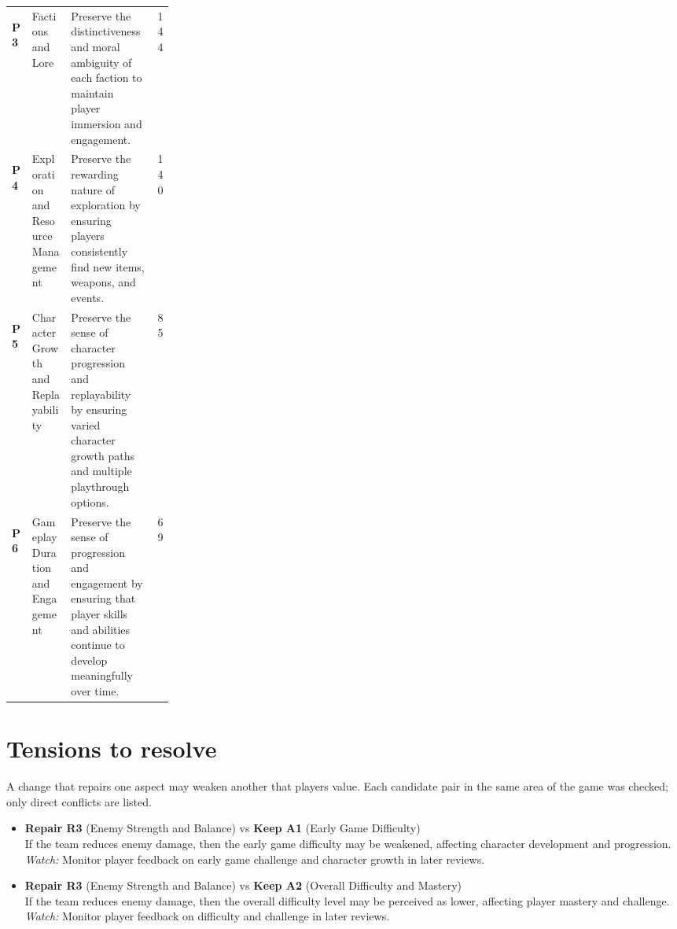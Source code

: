 \documentclass[10pt]{article}
\begin{document}
{\begin{tabularx}{\linewidth}{l p{0.24\linewidth} X r}
  \colorbox{lP}{\strut\textcolor{gP}{\textbf{P3}}} & Factions and Lore & Preserve the distinctiveness and moral ambiguity of each faction to maintain player immersion and engagement. & 144 \\
  \colorbox{lP}{\strut\textcolor{gP}{\textbf{P4}}} & Exploration and Resource Management & Preserve the rewarding nature of exploration by ensuring players consistently find new items, weapons, and events. & 140 \\
  \colorbox{lP}{\strut\textcolor{gP}{\textbf{P5}}} & Character Growth and Replayability & Preserve the sense of character progression and replayability by ensuring varied character growth paths and multiple playthrough options. & 85 \\
  \colorbox{lP}{\strut\textcolor{gP}{\textbf{P6}}} & Gameplay Duration and Engagement & Preserve the sense of progression and engagement by ensuring that player skills and abilities continue to develop meaningfully over time. & 69 \\
  \bottomrule
\end{tabularx}}

\section*{Tensions to resolve}
{\small\textcolor{ink2}{A change that repairs one aspect may weaken another that players value. Each candidate pair in the same area of the game was checked; only direct conflicts are listed.}}
\begin{itemize}[leftmargin=12pt]
  \item \textbf{Repair R3} (Enemy Strength and Balance) vs \textbf{Keep A1} (Early Game Difficulty)\\
If the team reduces enemy damage, then the early game difficulty may be weakened, affecting character development and progression. \textit{Watch:} Monitor player feedback on early game challenge and character growth in later reviews.
  \item \textbf{Repair R3} (Enemy Strength and Balance) vs \textbf{Keep A2} (Overall Difficulty and Mastery)\\
If the team reduces enemy damage, then the overall difficulty level may be perceived as lower, affecting player mastery and challenge. \textit{Watch:} Monitor player feedback on difficulty and challenge in later reviews.
\end{itemize}

\newpage
\end{document}
